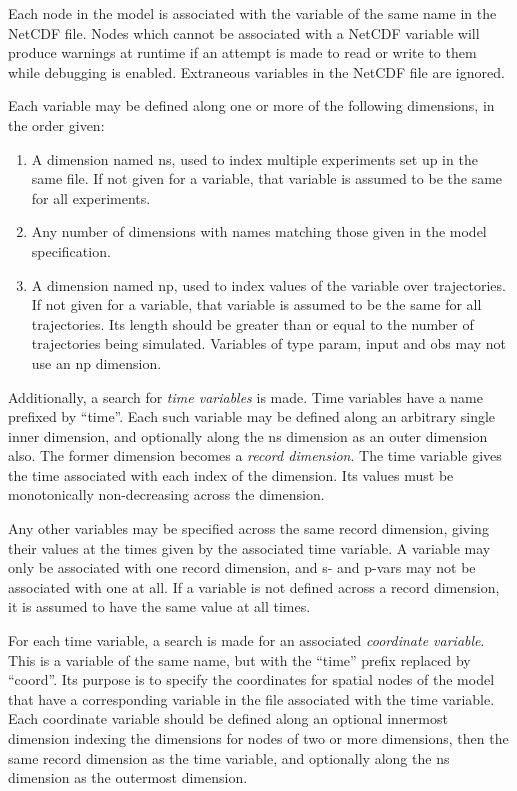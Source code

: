 Each node in the model is associated with the variable of the same name in the
NetCDF file. Nodes which cannot be associated with a NetCDF variable will
produce warnings at runtime if an attempt is made to read or write to them
while debugging is enabled. Extraneous variables in the NetCDF file are
ignored.

Each variable may be defined along one or more of the following dimensions, in
the order given:
\begin{enumerate}
\item A dimension named \textsf{ns}, used to index multiple experiments set up
  in the same file. If not given for a variable, that variable is assumed to
  be the same for all experiments.
\item Any number of dimensions with names matching those given in the model
  specification.
\item A dimension named \textsf{np}, used to index values of the variable over
  trajectories. If not given for a variable, that variable is assumed to be
  the same for all trajectories. Its length should be greater than or equal to
  the number of trajectories being simulated. Variables of type
  \textsf{param}, \textsf{input} and \textsf{obs} may not use an \textsf{np}
  dimension.
\end{enumerate}

Additionally, a search for \emph{time variables} is
made. Time variables have a name prefixed by ``time''. Each such variable may
be defined along an arbitrary single inner dimension, and optionally along the
\textsf{ns} dimension as an outer dimension also. The former dimension becomes
a \emph{record dimension}. The time variable gives the
time associated with each index of the dimension. Its values must be
monotonically non-decreasing across the dimension.

Any other variables may be specified across the same record dimension,
giving their values at the times given by the associated time variable.
A variable may only be associated with one record dimension, and s- and
p-vars may not be associated with one at all. If a variable is not defined
across a record dimension, it is assumed to have the same value at all
times.

For each time variable, a search is made for an associated \emph{coordinate
  variable}. This is a variable of the same name,
but with the ``time'' prefix replaced by ``coord''. Its purpose is to specify
the coordinates for spatial nodes of the model that have a corresponding
variable in the file associated with the time variable. Each coordinate
variable should be defined along an optional innermost dimension indexing the
dimensions for nodes of two or more dimensions, then the same record dimension
as the time variable, and optionally along the \textsf{ns} dimension as the
outermost dimension.

